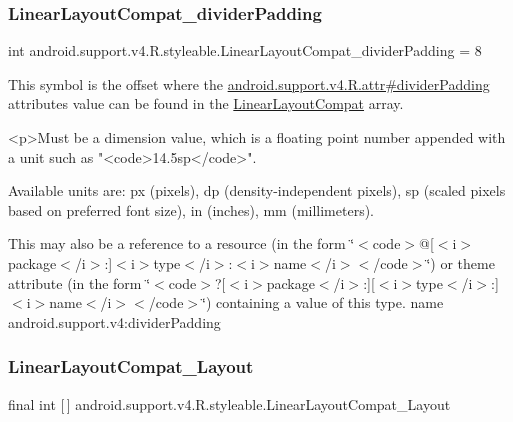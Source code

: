 \subsubsection{\texorpdfstring{Linear\+Layout\+Compat\+\_\+divider\+Padding}{LinearLayoutCompat\_dividerPadding}}
{\footnotesize\ttfamily int android.\+support.\+v4.\+R.\+styleable.\+Linear\+Layout\+Compat\+\_\+divider\+Padding = 8\hspace{0.3cm}{\ttfamily [static]}}

This symbol is the offset where the \hyperlink{classandroid_1_1support_1_1v4_1_1R_1_1attr_a461342995bae205ef8b059feee4e4b9e}{android.\+support.\+v4.\+R.\+attr\#divider\+Padding} attribute\textquotesingle{}s value can be found in the \hyperlink{classandroid_1_1support_1_1v4_1_1R_1_1styleable_a5410acb05d349e2b35bd2dbadc93b229}{Linear\+Layout\+Compat} array.

\begin{DoxyVerb}      <p>Must be a dimension value, which is a floating point number appended with a unit such as "<code>14.5sp</code>".
\end{DoxyVerb}
 Available units are\+: px (pixels), dp (density-\/independent pixels), sp (scaled pixels based on preferred font size), in (inches), mm (millimeters). 

This may also be a reference to a resource (in the form \char`\"{}$<$code$>$@\mbox{[}$<$i$>$package$<$/i$>$\+:\mbox{]}$<$i$>$type$<$/i$>$\+:$<$i$>$name$<$/i$>$$<$/code$>$\char`\"{}) or theme attribute (in the form \char`\"{}$<$code$>$?\mbox{[}$<$i$>$package$<$/i$>$\+:\mbox{]}\mbox{[}$<$i$>$type$<$/i$>$\+:\mbox{]}$<$i$>$name$<$/i$>$$<$/code$>$\char`\"{}) containing a value of this type.  name android.\+support.\+v4\+:divider\+Padding \mbox{\label{classandroid_1_1support_1_1v4_1_1R_1_1styleable_ab5a97ab75cdbaa876aefad785e26581d}} 
\subsubsection{\texorpdfstring{Linear\+Layout\+Compat\+\_\+\+Layout}{LinearLayoutCompat\_Layout}}
{\footnotesize\ttfamily final int \mbox{[}$\,$\mbox{]} android.\+support.\+v4.\+R.\+styleable.\+Linear\+Layout\+Compat\+\_\+\+Layout\hspace{0.3cm}{\ttfamily [static]}}

